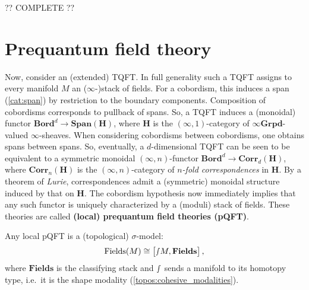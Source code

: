     ?? COMPLETE ??

\section{Prequantum field theory}

    Now, consider an (extended) TQFT. In full generality such a TQFT assigns to every manifold $M$ an ($\infty$-)stack of fields. For a cobordism, this induces a span (\cref{cat:span}) by restriction to the boundary components. Composition of cobordisms corresponds to pullback of spans. So, a TQFT induces a (monoidal) functor $\mathbf{Bord}^d\rightarrow\mathbf{Span}(\mathbf{H})$, where $\mathbf{H}$ is the $(\infty,1)$-category of $\infty\mathbf{Grpd}$-valued $\infty$-sheaves. When considering cobordisms between cobordisms, one obtains spans between spans. So, eventually, a $d$-dimensional TQFT can be seen to be equivalent to a symmetric monoidal $(\infty,n)$-functor $\mathbf{Bord}^d\rightarrow\mathbf{Corr}_d(\mathbf{H})$, where $\mathbf{Corr}_n(\mathbf{H})$ is the $(\infty,n)$-category of \textit{$n$-fold correspondences} in $\mathbf{H}$. By a theorem of \textit{Lurie}, correspondences admit a (symmetric) monoidal structure induced by that on $\mathbf{H}$. The cobordism hypothesis now immediately implies that any such functor is uniquely characterized by a (moduli) stack of fields. These theories are called \textbf{(local) prequantum field theories (pQFT)}.

    \begin{property}
        Any local pQFT is a (topological) $\sigma$-model:
        \begin{gather}
            \mathrm{Fields}(M)\cong\bigl[\smallint\!M,\mathbf{Fields}\bigr]\,,
        \end{gather}
        where $\mathbf{Fields}$ is the classifying stack and $\smallint$ sends a manifold to its homotopy type, i.e.~it is the shape modality (\cref{topos:cohesive_modalities}).
    \end{property}

